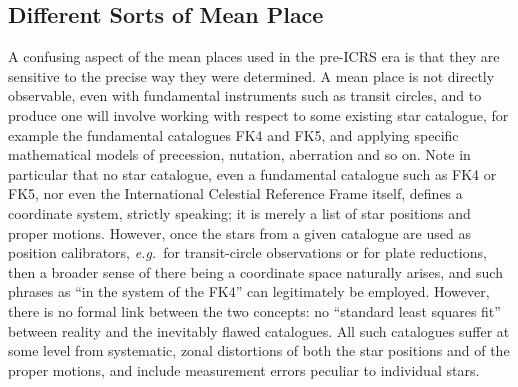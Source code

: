\documentclass[11pt,fleqn,twoside]{article}
\renewcommand{\_}{{\tt\char'137}}     %
\begin{document}
\subsection{Different Sorts of Mean Place}
A confusing aspect of the mean places used in the
pre-ICRS era is that they
are sensitive to the precise way they were determined.  A mean
place is not directly observable, even with fundamental
instruments such as transit circles, and to produce one
will involve working with respect to some existing star catalogue,
for example the fundamental catalogues FK4 and FK5,
and applying specific mathematical models of precession, nutation,
aberration and so on.
Note in particular that no star catalogue,
even a fundamental catalogue such as FK4 or
FK5, nor even the International Celestial
Reference Frame itself,
defines a coordinate system, strictly speaking;
it is merely a list of star positions and proper motions.
However, once the stars from a given catalogue
are used as position calibrators, {\it e.g.}\ for
transit-circle observations or for plate reductions, then a
broader sense of there being a coordinate space naturally
arises, and such phrases as ``in the system of
the FK4'' can legitimately be employed.  However,
there is no formal link between the
two concepts: no ``standard least squares fit'' between
reality and the inevitably flawed catalogues.
All such
catalogues suffer at some level from systematic, zonal distortions
of both the star positions and of the proper motions,
and include measurement errors peculiar to individual
stars.
\end{document}
